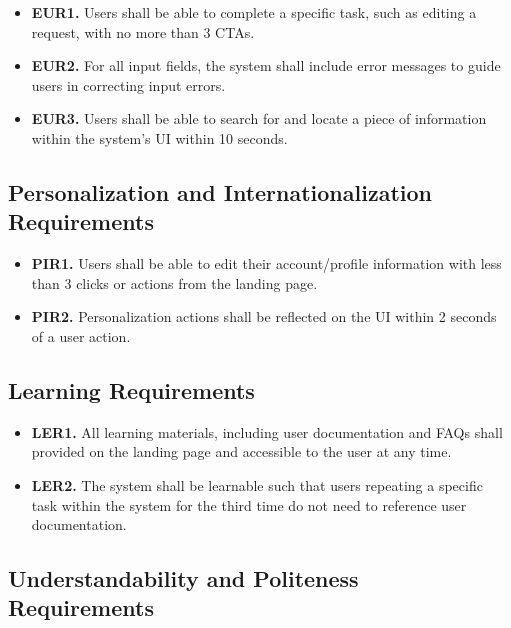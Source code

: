 \documentclass[12pt]{article}
\begin{document}
\label{EUR}

\begin{itemize}
    \item \textbf{EUR1.} Users shall be able to complete a specific task, such as editing a request, with no more than 3 CTAs.
    \item \textbf{EUR2.} For all input fields, the system shall include error messages to guide users in correcting input errors.
    \item \textbf{EUR3.} Users shall be able to search for and locate a piece of information within the system's UI within 10 seconds.
\end{itemize}

\subsection{Personalization and Internationalization Requirements}

\label{PIR}

\begin{itemize}
    \item \textbf{PIR1.} Users shall be able to edit their account/profile information with less than 3 clicks or actions from the landing page.
    \item \textbf{PIR2.} Personalization actions shall be reflected on the UI within 2 seconds of a user action.
\end{itemize}

\subsection{Learning Requirements}

\label{LER}

\begin{itemize}
    \item \textbf{LER1.} All learning materials, including user documentation and FAQs shall provided on the landing page and accessible to the user at any time.
    \item \textbf{LER2.} The system shall be learnable such that users repeating a specific task within the system for the third time do not need to reference user documentation.
\end{itemize}

\subsection{Understandability and Politeness Requirements}
\end{document}
